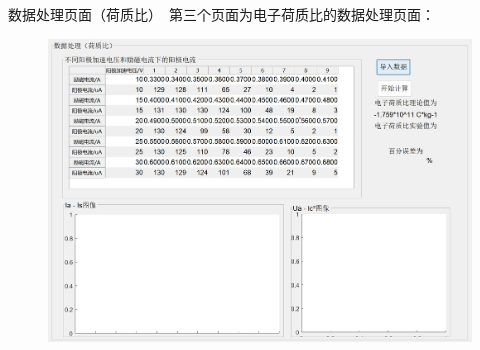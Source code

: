 \documentclass{beamer}
\begin{document}
    \begin{frame}{数据处理页面（荷质比）}{\thesection \, \secname}
        第三个页面为电子荷质比的数据处理页面：
        \begin{figure}
            \centering
            \includegraphics[scale=0.28]{gallery/pic7.jpg}
        \end{figure}
    \end{frame}
\end{document}

